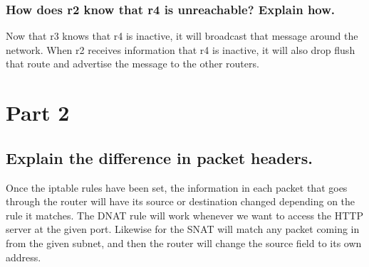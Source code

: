 \documentclass{article}
\begin{document}
\subsubsection{How does r2 know that r4 is unreachable? Explain how.}
Now that r3 knows that r4 is inactive, it will broadcast that message around the network.
When r2 receives information that r4 is inactive, it will also drop flush that route
and advertise the message to the other routers.

\section{Part 2}
\subsection{Explain the difference in packet headers.}
Once the iptable rules have been set, the information in each packet that goes through
the router will have its source or destination changed depending on the rule it matches.
The DNAT rule will work whenever we want to access the HTTP server at the given port.
Likewise for the SNAT will match any packet coming in from the given subnet, and then
the router will change the source field to its own address.
\end{document}
